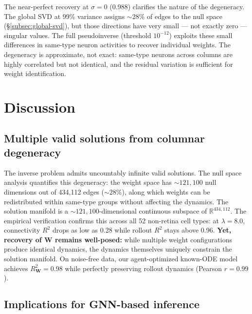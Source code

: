 \documentclass[11pt,a4paper]{article}
\begin{document}
The near-perfect recovery at $\sigma = 0$ (0.988) clarifies the nature of the degeneracy. The global SVD at 99\% variance assigns $\sim$28\% of edges to the null space (\S\ref{subsec:global-svd}), but those directions have very small — not exactly zero — singular values. The full pseudoinverse (threshold $10^{-12}$) exploits these small differences in same-type neuron activities to recover individual weights. The degeneracy is approximate, not exact: same-type neurons across columns are highly correlated but not identical, and the residual variation is sufficient for weight identification.

\section{Discussion}

\subsection{Multiple valid solutions from columnar degeneracy}

The inverse problem admits uncountably infinite valid solutions. The null space analysis quantifies this degeneracy: the weight space has ${\sim}121{,}100$ null dimensions out of 434,112 edges (${\sim}28\%$), along which weights can be redistributed within same-type groups without affecting the dynamics. The solution manifold is a ${\sim}121{,}100$-dimensional continuous subspace of $\mathbb{R}^{434{,}112}$. The empirical verification confirms this across all 52 non-retina cell types: at $\lambda = 8.0$, connectivity $R^2$ drops as low as 0.28 while rollout $R^2$ stays above 0.96. \textbf{Yet, recovery of $\mathbf{W}$ remains well-posed:} while multiple weight configurations produce identical dynamics, the dynamics themselves uniquely constrain the solution manifold. On noise-free data, our agent-optimized known-ODE model achieves $R^2_{\mathbf{W}} = 0.98$ while perfectly preserving rollout dynamics (Pearson $r = 0.99$).

\subsection{Implications for GNN-based inference}
\end{document}
